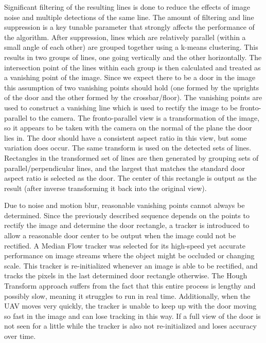 \documentclass[12pt]{article}
\begin{document}
Significant filtering of the resulting lines is done to reduce the effects of image noise and multiple detections of the same line. The amount of filtering and line suppression is a key tunable parameter that strongly affects the performance of the algorithm. After suppression, lines which are relatively parallel (within a small angle of each other) are grouped together using a k-means clustering. This results in two groups of lines, one going vertically and the other horizontally. The intersection point of the lines within each group is then calculated and treated as a vanishing point of the image. Since we expect there to be a door in the image this assumption of two vanishing points should hold (one formed by the uprights of the door and the other formed by the crossbar/floor). The vanishing points are used to construct a vanishing line which is used to rectify the image to be fronto-parallel to the camera. The fronto-parallel view is a transformation of the image, so it appears to be taken with the camera on the normal of the plane the door lies in. The door should have a consistent aspect ratio in this view, but some variation does occur. The same transform is used on the detected sets of lines. Rectangles in the transformed set of lines are then generated by grouping sets of parallel/perpendicular lines, and the largest that matches the standard door aspect ratio is selected as the door. The center of this rectangle is output as the result (after inverse transforming it back into the original view). 

Due to noise and motion blur, reasonable vanishing points cannot always be determined. Since the previously described sequence depends on the points to rectify the image and determine the door rectangle, a tracker is introduced to allow a reasonable door center to be output when the image could not be rectified. A Median Flow tracker \cite{medianFlow} was selected for its high-speed yet accurate performance on image streams where the object might be occluded or changing scale. This tracker is re-initialized whenever an image is able to be rectified, and tracks the pixels in the last determined door rectangle otherwise. The Hough Transform approach suffers from the fact that this entire process is lengthy and possibly slow, meaning it struggles to run in real time. Additionally, when the UAV moves very quickly, the tracker is unable to keep up with the door moving so fast in the image and can lose tracking in this way. If a full view of the door is not seen for a little while the tracker is also not re-initialized and loses accuracy over time. 
\end{document}
